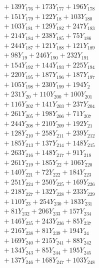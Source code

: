\documentclass[a4paper,10pt]{article}
\begin{document}
{\begin{align}
&\quad  + 139Y_{176} + 173Y_{177} + 196Y_{178} \\[0.5ex]
&\quad  + 151Y_{179} + 122Y_{18} + 103Y_{180} \\[0.5ex]
&\quad  + 103Y_{181} + 129Y_{182} + 247Y_{183} \\[0.5ex]
&\quad  + 214Y_{184} + 238Y_{185} + 75Y_{186} \\[0.5ex]
&\quad  + 244Y_{187} + 121Y_{188} + 121Y_{189} \\[0.5ex]
&\quad  + 98Y_{19} + 246Y_{190} + 232Y_{191} \\[0.5ex]
&\quad  + 154Y_{192} + 144Y_{193} + 225Y_{194} \\[0.5ex]
&\quad  + 220Y_{195} + 187Y_{196} + 187Y_{197} \\[0.5ex]
&\quad  + 105Y_{198} + 230Y_{199} + 194Y_{2} \\[0.5ex]
&\quad  + 231Y_{20} + 110Y_{200} + 100Y_{201} \\[0.5ex]
&\quad  + 116Y_{202} + 141Y_{203} + 237Y_{204} \\[0.5ex]
&\quad  + 261Y_{205} + 198Y_{206} + 71Y_{207} \\[0.5ex]
&\quad  + 244Y_{208} + 210Y_{209} + 192Y_{21} \\[0.5ex]
&\quad  + 128Y_{210} + 258Y_{211} + 239Y_{212} \\[0.5ex]
&\quad  + 185Y_{213} + 137Y_{214} + 148Y_{215} \\[0.5ex]
&\quad  + 263Y_{216} + 148Y_{217} + 91Y_{218} \\[0.5ex]
&\quad  + 261Y_{219} + 185Y_{22} + 106Y_{220} \\[0.5ex]
&\quad  + 140Y_{221} + 72Y_{222} + 184Y_{223} \\[0.5ex]
&\quad  + 251Y_{224} + 250Y_{225} + 169Y_{226} \\[0.5ex]
&\quad  + 218Y_{227} + 132Y_{228} + 233Y_{229} \\[0.5ex]
&\quad  + 110Y_{23} + 254Y_{230} + 183Y_{231} \\[0.5ex]
&\quad  + 81Y_{232} + 206Y_{233} + 157Y_{234} \\[0.5ex]
&\quad  + 146Y_{235} + 243Y_{236} + 85Y_{237} \\[0.5ex]
&\quad  + 216Y_{238} + 81Y_{239} + 194Y_{24} \\[0.5ex]
&\quad  + 169Y_{240} + 215Y_{241} + 88Y_{242} \\[0.5ex]
&\quad  + 134Y_{243} + 85Y_{244} + 195Y_{245} \\[0.5ex]
&\quad  + 137Y_{246} + 168Y_{247} + 103Y_{248} \\[0.5ex]

\end{align}}
\end{document}
